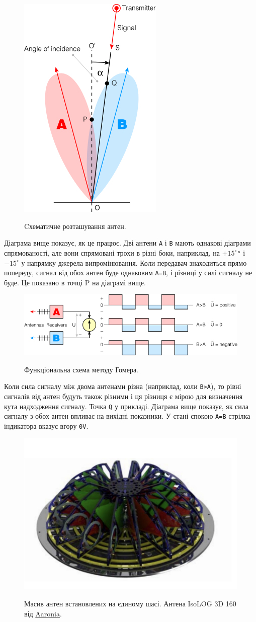\documentclass{article}
\begin{document}
\begin{figure}[H]
\centering
{\includegraphics[width=0.3\linewidth]{images/homer.png}}
\caption{\label{fig:homer}Cхематичне розташування антен.}
\end{figure}

Діаграма вище показує, як це працює. Дві антени \texttt{A} і \texttt{B} мають однакові діаграми спрямованості, але вони спрямовані трохи в різні боки, наприклад, на \texttt{$+15^\circ$°} і \texttt{$-15^\circ$} у напрямку джерела випромінювання. Коли передавач знаходиться прямо попереду, сигнал від обох антен буде однаковим \texttt{A=B}, і різниці у силі сигналу не буде. Це показано в точці P на діаграмі вище.

\begin{figure}[H]
\centering
{\includegraphics[width=0.7\linewidth]{images/homer_meter.png}}
\caption{\label{fig:homer:meter}Функціональна схема методу Гомера.}
\end{figure}

Коли сила сигналу між двома антенами різна (наприклад, коли \texttt{B>A}), то рівні сигналів від антен будуть також різними і ця різниця є мірою для визначення кута надходження сигналу. Точка \texttt{Q} у прикладі. Діаграма вище показує, як сила сигналу з обох антен впливає на вихідні показники. У стані спокою \texttt{A=B} стрілка індикатора вказує вгору \texttt{0V}.

\begin{figure}[H]
\centering
{\includegraphics[width=0.6\linewidth]{images/isolog-3d-160.png}}
\caption{\label{fig:isolog-3d}Масив антен встановлених на єдиному шасі. Антена IsoLOG 3D 160 від \href{https://aaronia.com/en/produkte/antennas/isolog-3d-df}{Aaronia}.}
\end{figure}
\end{document}
